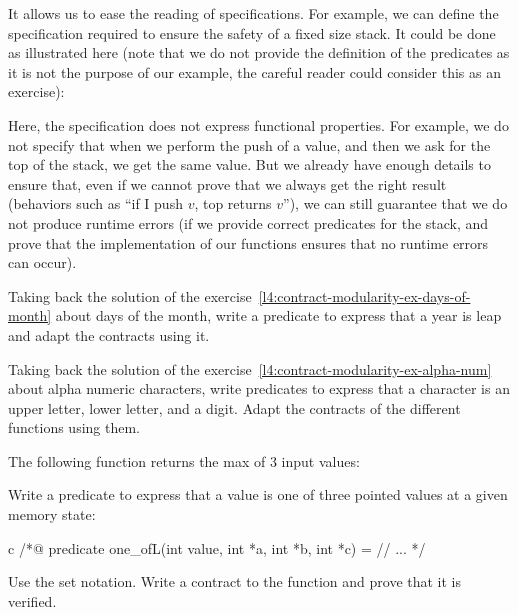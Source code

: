 It allows us to ease the reading of specifications. For example, we can
define the specification required to ensure the safety of a fixed size
stack. It could be done as illustrated here (note that we do not
provide the definition of the predicates as it is not the purpose of
our example, the careful reader could consider this as an exercise):






Here, the specification does not express functional properties. For
example, we do not specify that when we perform the push of a value, and
then we ask for the top of the stack, we get the same value. But we
already have enough details to ensure that, even if we cannot prove that
we always get the right result (behaviors such as ``if I push \(v\), top
returns \(v\)''), we can still guarantee that we do not produce runtime
errors (if we provide correct predicates for the stack, and prove
that the implementation of our functions ensures that no runtime errors
can occur).






Taking back the solution of the
exercise~\ref{l4:contract-modularity-ex-days-of-month} about days of the month,
write a predicate to express that a year is leap and adapt the contracts using
it.




Taking back the solution of the
exercise~\ref{l4:contract-modularity-ex-alpha-num} about alpha numeric
characters, write predicates to express that a character is an upper letter,
lower letter, and a digit. Adapt the contracts of the different functions using
them.




The following function returns the max of 3 input values:




Write a predicate to express that a value is one of three pointed values at a
given memory state:

\begin{CodeBlock}{c}
/*@
  predicate one_of{L}(int value, int *a, int *b, int *c) =
    // ...
*/
\end{CodeBlock}

Use the set notation. Write a contract to the function and prove that it is
verified.



